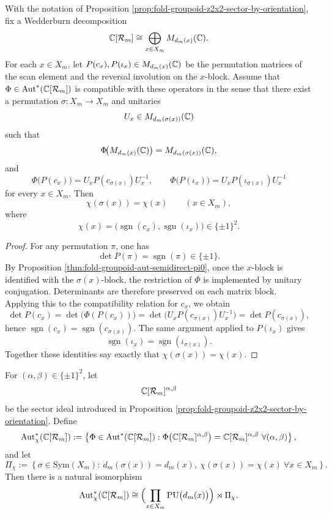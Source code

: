 \begin{proposition}\label{thm:fold-groupoid-chi-rigidity}
With the notation of Proposition \ref{prop:fold-groupoid-z2x2-sector-by-orientation}, fix a Wedderburn decomposition
\[
\mathbb{C}[\mathcal R_m]\cong\bigoplus_{x\in X_m}M_{d_m(x)}(\mathbb{C}).
\]
For each \(x\in X_m\), let \(P(c_x),P(\iota_x)\in M_{d_m(x)}(\mathbb{C})\) be the permutation matrices of the scan element and the reversal involution on the \(x\)-block. Assume that \(\Phi\in\operatorname{Aut}^\ast(\mathbb{C}[\mathcal R_m])\) is compatible with these operators in the sense that there exist a permutation \(\sigma:X_m\to X_m\) and unitaries
\[
U_x\in M_{d_m(\sigma(x))}(\mathbb{C})
\]
such that
\[
\Phi\!\bigl(M_{d_m(x)}(\mathbb{C})\bigr)=M_{d_m(\sigma(x))}(\mathbb{C}),
\]
and
\[
\Phi\!\bigl(P(c_x)\bigr)=U_xP(c_{\sigma(x)})U_x^{-1},
\qquad
\Phi\!\bigl(P(\iota_x)\bigr)=U_xP(\iota_{\sigma(x)})U_x^{-1}
\]
for every \(x\in X_m\). Then
\[
\chi(\sigma(x))=\chi(x)
\qquad(x\in X_m),
\]
where
\[
\chi(x)=\bigl(\operatorname{sgn}(c_x),\operatorname{sgn}(\iota_x)\bigr)\in\{\pm1\}^2.
\]
\end{proposition}

\begin{proof}
For any permutation \(\pi\), one has
\[
\det P(\pi)=\operatorname{sgn}(\pi)\in\{\pm1\}.
\]
By Proposition \ref{thm:fold-groupoid-aut-semidirect-pi0}, once the \(x\)-block is identified with the \(\sigma(x)\)-block, the restriction of \(\Phi\) is implemented by unitary conjugation. Determinants are therefore preserved on each matrix block. Applying this to the compatibility relation for \(c_x\), we obtain
\[
\det P(c_x)
=
\det\!\bigl(\Phi(P(c_x))\bigr)
=
\det\!\bigl(U_xP(c_{\sigma(x)})U_x^{-1}\bigr)
=
\det P(c_{\sigma(x)}),
\]
hence \(\operatorname{sgn}(c_x)=\operatorname{sgn}(c_{\sigma(x)})\). The same argument applied to \(P(\iota_x)\) gives
\[
\operatorname{sgn}(\iota_x)=\operatorname{sgn}(\iota_{\sigma(x)}).
\]
Together these identities say exactly that \(\chi(\sigma(x))=\chi(x)\).
\end{proof}

\begin{proposition}\label{prop:fold-groupoid-aut-chi-semidirect-classification}
For \((\alpha,\beta)\in\{\pm1\}^2\), let
\[
\mathbb{C}[\mathcal{R}_m]^{\alpha,\beta}
\]
be the sector ideal introduced in Proposition \ref{prop:fold-groupoid-z2x2-sector-by-orientation}. Define
\[
\operatorname{Aut}^\ast_{\chi}(\mathbb{C}[\mathcal R_m])
:=
\left\{\Phi\in\operatorname{Aut}^\ast(\mathbb{C}[\mathcal R_m]):
\Phi\bigl(\mathbb{C}[\mathcal R_m]^{\alpha,\beta}\bigr)=\mathbb{C}[\mathcal R_m]^{\alpha,\beta}\ \forall(\alpha,\beta)\right\},
\]
and let
\[
\Pi_{\chi}
:=
\left\{\sigma\in\mathrm{Sym}(X_m):\ d_m(\sigma(x))=d_m(x),\ \chi(\sigma(x))=\chi(x)\ \forall x\in X_m\right\}.
\]
Then there is a natural isomorphism
\[
\operatorname{Aut}^\ast_{\chi}(\mathbb{C}[\mathcal R_m])
\cong
\Bigl(\prod_{x\in X_m}\mathrm{PU}\bigl(d_m(x)\bigr)\Bigr)\rtimes \Pi_{\chi}.
\]
\end{proposition}

